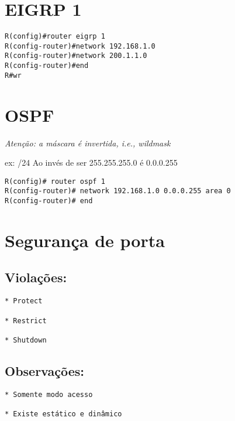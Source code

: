 \documentclass[]{article}
\begin{document}
\hypertarget{eigrp-1}{%
\section{EIGRP 1}\label{eigrp-1}}

\begin{verbatim}
R(config)#router eigrp 1
R(config-router)#network 192.168.1.0
R(config-router)#network 200.1.1.0
R(config-router)#end
R#wr
\end{verbatim}

\hypertarget{ospf}{%
\section{OSPF}\label{ospf}}

\emph{Atenção: a máscara é invertida, i.e., wildmask}

ex: /24 Ao invés de ser 255.255.255.0 é 0.0.0.255

\begin{verbatim}
R(config)# router ospf 1
R(config-router)# network 192.168.1.0 0.0.0.255 area 0
R(config-router)# end
\end{verbatim}

\hypertarget{seguranuxe7a-de-porta}{%
\section{Segurança de porta}\label{seguranuxe7a-de-porta}}

\hypertarget{violauxe7uxf5es}{%
\subsection{Violações:}\label{violauxe7uxf5es}}

\begin{verbatim}
* Protect

* Restrict

* Shutdown
\end{verbatim}

\hypertarget{observauxe7uxf5es}{%
\subsection{Observações:}\label{observauxe7uxf5es}}

\begin{verbatim}
* Somente modo acesso

* Existe estático e dinâmico
\end{verbatim}
\end{document}
